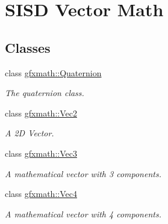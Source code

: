 \hypertarget{group___s_i_s_d_vec_math}{}\section{S\+I\+S\+D Vector Math}
\label{group___s_i_s_d_vec_math}
\subsection*{Classes}
\begin{DoxyCompactItemize}
\item 
class \hyperlink{classgfxmath_1_1_quaternion}{gfxmath\+::\+Quaternion}
\begin{DoxyCompactList}\small\item\em The quaternion class. \end{DoxyCompactList}\item 
class \hyperlink{classgfxmath_1_1_vec2}{gfxmath\+::\+Vec2}
\begin{DoxyCompactList}\small\item\em A 2\+D Vector. \end{DoxyCompactList}\item 
class \hyperlink{classgfxmath_1_1_vec3}{gfxmath\+::\+Vec3}
\begin{DoxyCompactList}\small\item\em A mathematical vector with 3 components. \end{DoxyCompactList}\item 
class \hyperlink{classgfxmath_1_1_vec4}{gfxmath\+::\+Vec4}
\begin{DoxyCompactList}\small\item\em A mathematical vector with 4 components. \end{DoxyCompactList}\end{DoxyCompactItemize}
